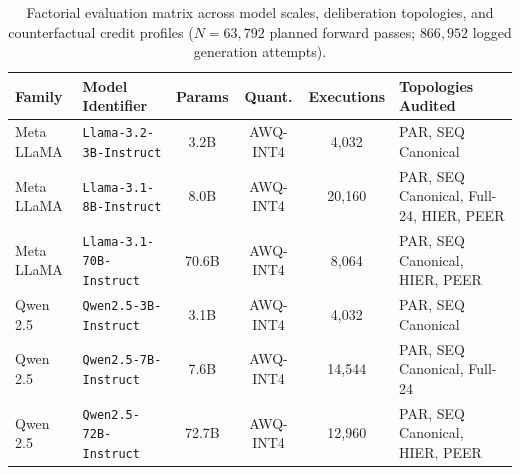 \begin{table}[t]
\centering
\caption{Factorial evaluation matrix across model scales, deliberation topologies, and counterfactual credit profiles ($N=63{,}792$ planned forward passes; $866{,}952$ logged generation attempts).}
\label{tab:model_scale}
\vspace{2pt}
\footnotesize
\setlength{\tabcolsep}{4.0pt}
\begin{tabular}{@{}llcccl@{}}
\toprule
\textbf{Family} & \textbf{Model Identifier} & \textbf{Params} & \textbf{Quant.} & \textbf{Executions} & \textbf{Topologies Audited} \\
\midrule
Meta LLaMA & \texttt{Llama-3.2-3B-Instruct} & 3.2B & AWQ-INT4 & 4,032 & PAR, SEQ Canonical \\
Meta LLaMA & \texttt{Llama-3.1-8B-Instruct} & 8.0B & AWQ-INT4 & 20,160 & PAR, SEQ Canonical, Full-24, HIER, PEER \\
Meta LLaMA & \texttt{Llama-3.1-70B-Instruct} & 70.6B & AWQ-INT4 & 8,064 & PAR, SEQ Canonical, HIER, PEER \\
\midrule
Qwen 2.5 & \texttt{Qwen2.5-3B-Instruct} & 3.1B & AWQ-INT4 & 4,032 & PAR, SEQ Canonical \\
Qwen 2.5 & \texttt{Qwen2.5-7B-Instruct} & 7.6B & AWQ-INT4 & 14,544 & PAR, SEQ Canonical, Full-24 \\
Qwen 2.5 & \texttt{Qwen2.5-72B-Instruct} & 72.7B & AWQ-INT4 & 12,960 & PAR, SEQ Canonical, HIER, PEER \\
\bottomrule
\end{tabular}
\end{table}
